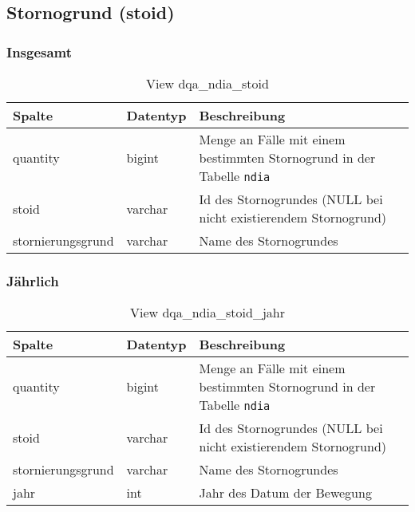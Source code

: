 \subsection{Stornogrund (stoid)} \label{subsec:bewStoid}

\subsubsection{Insgesamt} \label{subsubsec:bewStoidI}

\begin{table}[ht]
	\centering   
	\caption{View dqa\_ndia\_stoid}
	\label{tab:bewStoidI}
	\begin{tabular}{||l|l|p{10cm}||}   		
		\hline
		Spalte & Datentyp & Beschreibung \\ [0.5ex]
		\hline\hline
		quantity & bigint & Menge an Fälle mit einem bestimmten Stornogrund in der Tabelle \texttt{ndia} \\
		\hline
		stoid & varchar & Id des Stornogrundes (NULL bei nicht existierendem Stornogrund)\\
		\hline
		stornierungsgrund & varchar & Name des Stornogrundes \\
		\hline
	\end{tabular}
\end{table}

\newpage

\subsubsection{Jährlich} \label{subsubsec:bewStoidJ}

\begin{table}[ht]
	\centering   
	\caption{View dqa\_ndia\_stoid\_jahr}
	\label{tab:bewStoidJ}
	\begin{tabular}{||l|l|p{10cm}||}   		
		\hline
		Spalte & Datentyp & Beschreibung \\ [0.5ex]
		\hline\hline
		quantity & bigint & Menge an Fälle mit einem bestimmten Stornogrund in der Tabelle \texttt{ndia}\\
		\hline
		stoid & varchar & Id des Stornogrundes (NULL bei nicht existierendem Stornogrund)\\
		\hline
		stornierungsgrund & varchar & Name des Stornogrundes \\
		\hline
		jahr & int &  Jahr des Datum der Bewegung \\
		\hline		
	\end{tabular}
\end{table}


